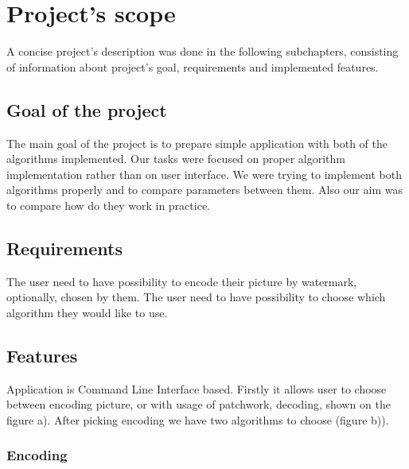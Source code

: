 \documentclass[a4paper, 12pt]{article}
\begin{document}
\section{Project's scope}

A concise project's description was done in the following subchapters, consisting of information about project's goal, requirements and implemented features.

\subsection{Goal of the project}
The main goal of the project is to prepare simple application with both of the algorithms implemented. Our tasks were focused on proper algorithm implementation rather than on user interface. We were trying to implement both algorithms properly and to compare parameters between them. Also our aim was to compare how do they work in practice.

\subsection{Requirements}

The user need to have possibility to encode their picture by watermark, optionally, chosen by them. The user need to have possibility to choose which algorithm they would like to use.

\newpage
\subsection{Features}

Application is Command Line Interface based. Firstly it allows user to choose between encoding picture, or with usage of patchwork, decoding, shown on the figure a). After picking encoding we have two algorithms to choose (figure b)).

\begin{figure}[!h]%
	\centering
	\qquad
	\label{}%
\end{figure}

\subsubsection{Encoding}
\end{document}
